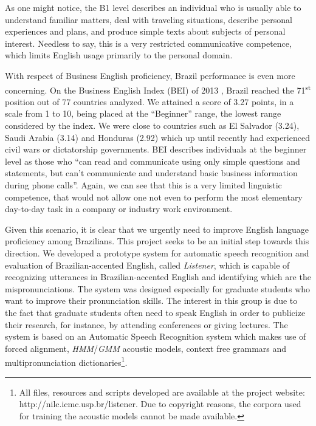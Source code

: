 \documentclass[twocolumn]{bmcart}%
\begin{document}
As one might notice,  the B1 level describes an individual who is usually able to understand familiar matters, deal with traveling situations, describe personal experiences and plans, and produce simple texts about subjects of personal interest. Needless to say, this is a very restricted communicative competence, which limits English usage primarily to the personal domain. 

With respect of Business English proficiency, Brazil performance is even more concerning. On the 
Business English Index (BEI) of 2013 \cite{BEI2013}, Brazil reached the 71\textsuperscript{st} position out of 77 countries analyzed. We attained a score of 3.27 points, in a scale from 1 to 10, being placed at the ``Beginner'' range, the lowest range considered by the index. We were close to countries such as El Salvador (3.24), Saudi Arabia (3.14) and Honduras (2.92) which up until recently had experienced civil wars or dictatorship governments. BEI describes individuals at the beginner level as those who ``can read and communicate using only simple questions and statements, but can't communicate and understand basic business information during phone calls''. Again, we can see that this is a very limited linguistic competence, that would not allow one not even to perform the most elementary day-to-day task in a company or industry work environment.

Given this scenario, it is clear that we urgently need to improve English language proficiency among Brazilians. This project seeks to be an initial step towards this direction. We developed a prototype system for automatic speech recognition and evaluation of Brazilian-accented English, called \emph{Listener}, which is capable of recognizing utterances in Brazilian-accented English and identifying which are the mispronunciations. The system was designed especially for graduate students who want to improve their pronunciation skills. The interest in this group is due to the fact that graduate students often need to speak English in order to publicize their research, for instance, by attending conferences or giving lectures. The system is based on an Automatic Speech Recognition system which makes use of forced alignment, \emph{HMM}/\emph{GMM} acoustic models, context free grammars and multipronunciation dictionaries\footnote{All files, resources and scripts developed are available at the project website: http://nilc.icmc.usp.br/listener. Due to copyright reasons, the corpora used for training the acoustic models cannot be made available. }.
\end{document}
